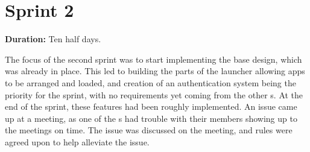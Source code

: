 \section{Sprint 2}%

\textbf{Duration:} Ten half days. 

The focus of the second sprint was to start implementing the base design, which was already in place.
This led to building the parts of the launcher allowing apps to be arranged and loaded, and creation of an authentication system being the priority for the sprint, with no requirements yet coming from the other \localgroup[]s. 
At the end of the sprint, these features had been roughly implemented. \newline
An issue came up at a meeting, as one of the \localgroup{}s had trouble with their members showing up to the meetings on time. 
The issue was discussed on the meeting, and rules were agreed upon to help alleviate the issue.